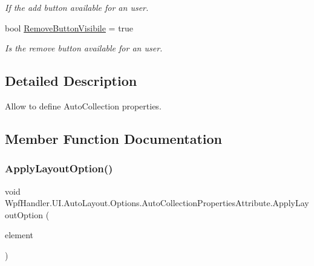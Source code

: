 \begin{DoxyCompactItemize}
\begin{DoxyCompactList}\small\item\em If the add button available for an user. \end{DoxyCompactList}\item 
bool \mbox{\hyperlink{class_wpf_handler_1_1_u_i_1_1_auto_layout_1_1_options_1_1_auto_collection_properties_attribute_a143a7de08e82032c232df0d05c2e1678}{Remove\+Button\+Visibile}} = true
\begin{DoxyCompactList}\small\item\em Is the remove button available for an user. \end{DoxyCompactList}\end{DoxyCompactItemize}


\subsection{Detailed Description}
Allow to define Auto\+Collection properties. 



\subsection{Member Function Documentation}
\mbox{\label{class_wpf_handler_1_1_u_i_1_1_auto_layout_1_1_options_1_1_auto_collection_properties_attribute_aaff2195c793c7e75ac553291d9189655}} 
\subsubsection{\texorpdfstring{Apply\+Layout\+Option()}{ApplyLayoutOption()}}
{\footnotesize\ttfamily void Wpf\+Handler.\+U\+I.\+Auto\+Layout.\+Options.\+Auto\+Collection\+Properties\+Attribute.\+Apply\+Layout\+Option (\begin{DoxyParamCaption}\item[{Framework\+Element}]{element }\end{DoxyParamCaption})}



